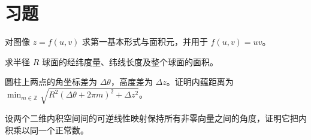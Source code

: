 \section{习题}
\begin{exercise}\label{ex:dg-metric-graph}
对图像 $z=f(u,v)$ 求第一基本形式与面积元，并用于 $f(u,v)=uv$。
\end{exercise}
\begin{exercise}\label{ex:dg-metric-sphere}
求半径 $R$ 球面的经纬度量、纬线长度及整个球面的面积。
\end{exercise}
\begin{exercise}\label{ex:dg-metric-cylinder}
圆柱上两点的角坐标差为 $\Delta\theta$，高度差为 $\Delta z$。证明内蕴距离为 $\min_{m\in\mathbb Z}\sqrt{R^2(\Delta\theta+2\pi m)^2+\Delta z^2}$。
\end{exercise}
\begin{exercise}\label{ex:dg-metric-conformal}
设两个二维内积空间间的可逆线性映射保持所有非零向量之间的角度，证明它把内积乘以同一个正常数。
\end{exercise}

